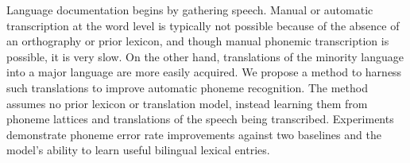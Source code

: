 Language documentation begins by gathering speech. Manual or automatic transcription at the word level is typically not possible because of the absence of an orthography or prior lexicon, and though manual phonemic transcription is possible, it is very slow. On the other hand, translations of the minority language into a major language are more easily acquired. We propose a method to harness such translations to improve automatic phoneme recognition. The method assumes no prior lexicon or translation model, instead learning them from phoneme lattices and translations of the speech being transcribed. Experiments demonstrate phoneme error rate improvements against two baselines and the model's ability to learn useful bilingual lexical entries.
